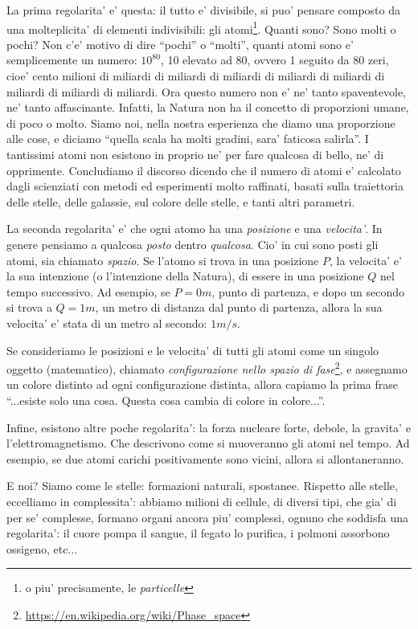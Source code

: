 La prima regolarita' e' questa: il tutto e' divisibile, si puo' pensare composto da una molteplicita' di elementi indivisibili: gli atomi\footnote{o piu' precisamente, le \emph{particelle}}.
Quanti sono? Sono molti o pochi? Non c'e' motivo di dire ``pochi'' o ``molti'', quanti atomi sono  e' semplicemente un numero: $10^{80}$, 10 elevato ad 80, ovvero 1 seguito da 80 zeri, cioe' cento milioni di miliardi di miliardi di miliardi di miliardi di miliardi di miliardi di miliardi di miliardi. 
Ora questo numero non e' ne' tanto spaventevole, ne' tanto affascinante. Infatti, la Natura non ha il concetto di proporzioni umane, di poco o molto. Siamo noi, nella nostra esperienza che diamo una proporzione alle cose, e diciamo ``quella scala ha molti gradini, sara' faticosa salirla''. 
I tantissimi atomi non esistono in proprio ne' per fare qualcosa di bello, ne' di opprimente.
Concludiamo il discorso dicendo che il numero di atomi e' calcolato dagli scienziati con metodi ed esperimenti molto raffinati, basati sulla traiettoria delle stelle, delle galassie, sul colore delle stelle, e tanti altri parametri.

La seconda regolarita' e' che ogni atomo ha una \emph{posizione} e una \emph{velocita'}. In genere pensiamo a qualcosa \emph{posto} dentro \emph{qualcosa}. Cio' in cui sono posti gli atomi, sia chiamato \emph{spazio}. Se l'atomo si trova in una posizione $P$, la velocita' e' la sua intenzione (o l'intenzione della Natura), di essere in una posizione $Q$ nel tempo successivo. Ad esempio, se $P=0m$, punto di partenza, e dopo un secondo si trova a $Q=1m$, un metro di distanza dal punto di partenza, allora la sua velocita' e' stata di un metro al secondo: $1 m/s$.

Se consideriamo le posizioni e le velocita' di tutti gli atomi come un singolo oggetto (matematico), chiamato \emph{configurazione nello spazio di fase}\footnote{\url{https://en.wikipedia.org/wiki/Phase\_space}}, e assegnamo un colore distinto ad ogni configurazione distinta, allora capiamo la prima frase ``...esiste solo una cosa. Questa cosa cambia di colore in colore...''.

Infine, esistono altre poche regolarita': la forza nucleare forte, debole, la gravita' e l'elettromagnetismo. Che descrivono come si muoveranno gli atomi nel tempo. Ad esempio, se due atomi carichi positivamente sono vicini, allora si allontaneranno.

E noi? Siamo come le stelle: formazioni naturali, spostanee. Rispetto alle stelle, eccelliamo in complessita': abbiamo milioni di cellule, di diversi tipi, che gia' di per se' complesse, formano organi ancora piu' complessi, ognuno che soddisfa una regolarita': il cuore pompa il sangue, il fegato lo purifica, i polmoni assorbono ossigeno, etc...

